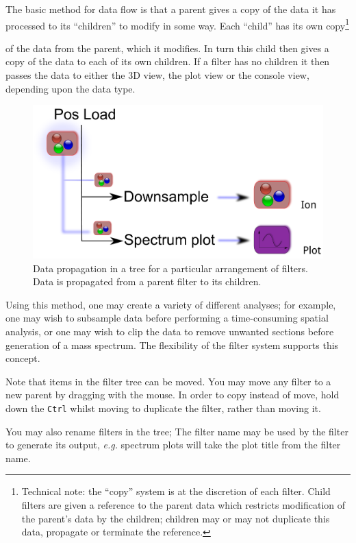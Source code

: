 \documentclass[10pt]{article}
\begin{document}
The basic method for data flow is that a parent gives a copy of the data it has processed to its ``children'' to modify in some way. Each ``child'' has its own copy\footnote{Technical note: the ``copy'' system is at the discretion of each filter. Child filters are given a reference to the parent data which restricts modification of the parent's data by the children; children may or may not duplicate this data, propagate or terminate the reference.}{of the data from the parent, which it modifies. In turn this child then gives a copy of the data to each of its own children. If a filter has no children it then passes the data to either the 3D view, the plot view or the console view, depending upon the data type.  

\begin{figure}[ht]
 \centering
 \includegraphics[width=0.9 \textwidth]{./figures/tree-propagate.pdf}
 \caption{Data propagation in a tree for a particular arrangement of filters. Data is propagated from a parent filter to its children.}
 \label{fig:datapropagate}
\end{figure}


Using this method, one may create a variety of different analyses; for example, one may wish to subsample data before performing a time-consuming spatial analysis, or one may wish to clip the data to remove unwanted sections before generation of a mass spectrum. The flexibility of the filter system supports this concept.

Note that items in the filter tree can be moved. You may move any filter to a new parent by dragging with the mouse. In order to copy instead of move, hold down the \texttt{Ctrl} whilst moving to duplicate the filter, rather than moving it.  

You may also rename filters in the tree; The filter name may be used by the filter to generate its output, \emph{e.g.} spectrum plots will take the plot title from the filter name. 



}
\end{document}
